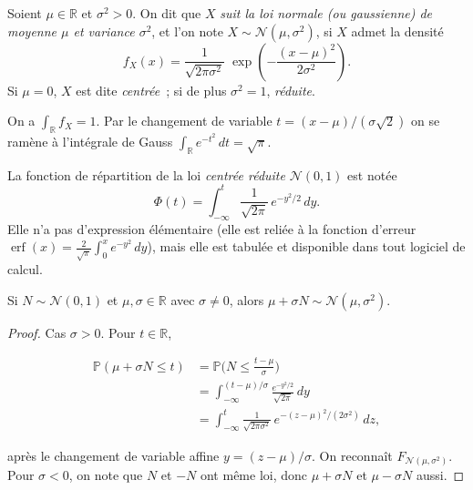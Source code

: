 \medskip

\begin{mdframed}
\begin{definition}
Soient $\mu\in\mathbb{R}$ et $\sigma^2>0$. On dit que $X$ \emph{suit la loi normale
(ou gaussienne) de moyenne $\mu$ et variance $\sigma^2$}, et l'on note
$X\sim\mathcal N(\mu,\sigma^2)$, si $X$ admet la densité
\[
  f_X(x)=\frac{1}{\sqrt{2\pi\sigma^2}}\;\exp\!\left(-\frac{(x-\mu)^2}{2\sigma^2}\right).
\]
Si $\mu=0$, $X$ est dite \emph{centrée}~; si de plus $\sigma^2=1$, \emph{réduite}.
\end{definition}
\end{mdframed}

\medskip

\begin{mdframed}
\begin{proposition}
On a $\int_\mathbb{R} f_X=1$. Par le changement de variable $t=(x-\mu)/(\sigma\sqrt2)$
on se ramène à l'intégrale de Gauss $\int_\mathbb{R} e^{-t^2}\,dt=\sqrt\pi$.
\end{proposition}
\end{mdframed}

\medskip

\begin{mdframed}
\begin{notation}
La fonction de répartition de la loi \emph{centrée réduite} $\mathcal N(0,1)$
est notée
\[
  \Phi(t)=\int_{-\infty}^{t}\frac{1}{\sqrt{2\pi}}\,e^{-y^2/2}\,dy.
\]
Elle n'a pas d'expression élémentaire (elle est reliée à la fonction d'erreur
$\operatorname{erf}(x)=\frac{2}{\sqrt\pi}\int_0^x e^{-y^2}\,dy$), mais elle est tabulée et
disponible dans tout logiciel de calcul.
\end{notation}
\end{mdframed}

\medskip

\begin{mdframed}
\begin{lemme}
\label{lem:normale-affine}
Si $N\sim\mathcal N(0,1)$ et $\mu,\sigma\in\mathbb{R}$ avec $\sigma\ne0$, alors
$\mu+\sigma N\sim\mathcal N(\mu,\sigma^2)$.
\end{lemme}
\end{mdframed}

\begin{proof}
Cas $\sigma>0$. Pour $t\in\mathbb{R}$,

\begin{align*}
  \mathbb{P}(\mu+\sigma N\le t) &=\mathbb{P}\!\Big(N\le\tfrac{t-\mu}{\sigma}\Big) \\
  &=\int_{-\infty}^{(t-\mu)/\sigma}\frac{e^{-y^2/2}}{\sqrt{2\pi}}\,dy \\
  &=\int_{-\infty}^{t}\frac{1}{\sqrt{2\pi\sigma^2}}\,
  e^{-(z-\mu)^2/(2\sigma^2)}\,dz,
\end{align*}

après le changement de variable affine $y=(z-\mu)/\sigma$. On reconnaît
$F_{\mathcal N(\mu,\sigma^2)}$. Pour $\sigma<0$, on note que $N$ et $-N$ ont
même loi, donc $\mu+\sigma N$ et $\mu-\sigma N$ aussi.
\end{proof}

